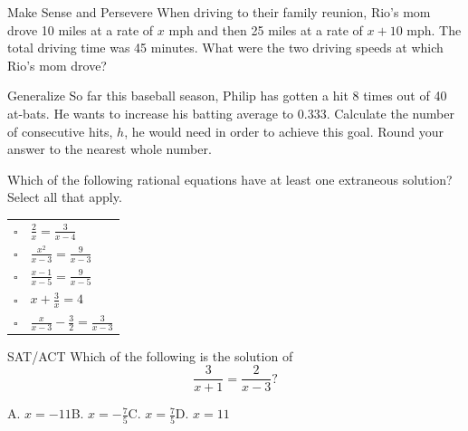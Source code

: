 \documentclass{article}
\newenvironment{practice}[2]{}{}        %
\newcommand{\answer}[1]{}               %
\begin{document}
\begin{practice}{29}{2}
Make Sense and Persevere When driving to their family reunion, Rio's mom drove 10 miles at a rate of $x$ mph and then 25 miles at a rate of $x+10$ mph. The total driving time was 45 minutes. What were the two driving speeds at which Rio's mom drove?
\answer{40 and 50 mi/h}
\end{practice}

\begin{practice}{30}{3}
Generalize So far this baseball season, Philip has gotten a hit 8 times out of 40 at-bats. He wants to increase his batting average to 0.333. Calculate the number of consecutive hits, $h$, he would need in order to achieve this goal. Round your answer to the nearest whole number.
\answer{$h=8$ hits}
\end{practice}

\begin{practice}{31}{1}
Which of the following rational equations have at least one extraneous solution? Select all that apply.

\begin{tabular}{ll}
$\square$ & $\frac{2}{x}=\frac{3}{x-4}$ \\
$\square$ & $\frac{x^2}{x-3}=\frac{9}{x-3}$ \\
$\square$ & $\frac{x-1}{x-5}=\frac{9}{x-5}$ \\
$\square$ & $x+\frac{3}{x}=4$ \\
$\square$ & $\frac{x}{x-3}-\frac{3}{2}=\frac{3}{x-3}$ \\
\end{tabular}
\answer{$\frac{x^2}{x-3}=\frac{9}{x-3}$ and $\frac{x}{x-3}-\frac{3}{2}=\frac{3}{x-3}$}
\end{practice}

\begin{practice}{32}{1}
SAT/ACT Which of the following is the solution of
\[
\frac{3}{x+1}=\frac{2}{x-3}?
\]

A. $x=-11$\qquad B. $x=-\frac{7}{5}$\qquad C. $x=\frac{7}{5}$\qquad D. $x=11$
\answer{D. $x=11$}
\end{practice}
\end{document}
